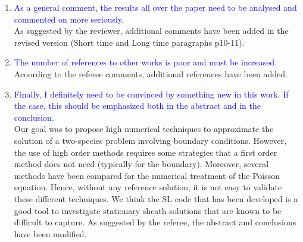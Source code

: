 \documentclass{article}
\begin{document}
\begin{enumerate}
    \item \textcolor{blue}{As a general comment, the results all over the paper need to be analysed and
commented on more seriously. }\\
As suggested by the reviewer, additional comments have been added in the revised version (Short time and Long time paragraphs p10-11). \\
    \item \textcolor{blue}{The number of references to other works is poor and must be increased. }\\
Acoording to the referee comments, additional references have been added. 
    \item \textcolor{blue}{Finally, I definitely need to be convinced by something new in this work. If the case, this
should be emphasized both in the abstract and in the conclusion. }\\
Our goal was to propose high numerical techniques to approximate the solution of a two-species problem involving boundary conditions. 
However, the use of high order methods requires some strategies that a first order method does not need (typically for the boundary). 
Moreover, several methods have been compared for the numerical treatment of the Poisson equation. 
Hence, without any reference solution, it is not easy to validate these different techniques.  We think the SL code 
that has been developed is a good tool to investigate stationary sheath solutions that are known to be difficult to capture.  
As suggested by the referee, the abstract and conclusions have been modified. \\
\end{enumerate}

\bigskip 
\end{document}
